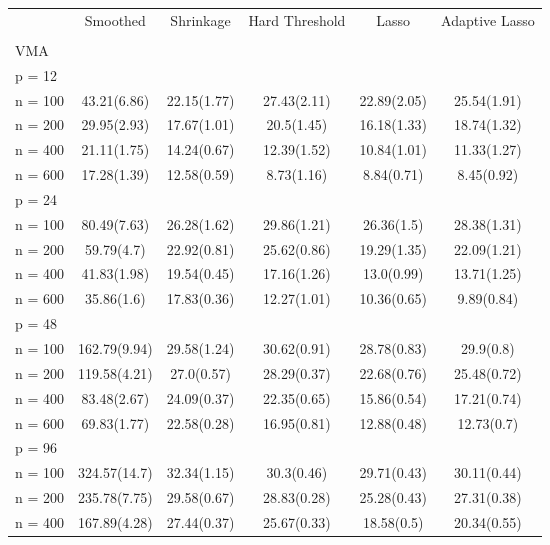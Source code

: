\begin{table}
\small
\begin{tabular}{l@{\hskip 0.4in}ccccc}
\\
& Smoothed   & Shrinkage & Hard Threshold  & Lasso & Adaptive Lasso\\
\\
VMA & & & & &\\
p = 12 & & & & &\\
\multicolumn{1}{r}{n = 100}&43.21(6.86)&22.15(1.77)&27.43(2.11)&22.89(2.05)&25.54(1.91)\\
\multicolumn{1}{r}{n = 200}&29.95(2.93)&17.67(1.01)&20.5(1.45)&16.18(1.33)&18.74(1.32)\\
\multicolumn{1}{r}{n = 400}&21.11(1.75)&14.24(0.67)&12.39(1.52)&10.84(1.01)&11.33(1.27)\\
\multicolumn{1}{r}{n = 600}&17.28(1.39)&12.58(0.59)&8.73(1.16)&8.84(0.71)&8.45(0.92)\\
p = 24 & & & & &\\
\multicolumn{1}{r}{n = 100}&80.49(7.63)&26.28(1.62)&29.86(1.21)&26.36(1.5)&28.38(1.31)\\
\multicolumn{1}{r}{n = 200}&59.79(4.7)&22.92(0.81)&25.62(0.86)&19.29(1.35)&22.09(1.21)\\
\multicolumn{1}{r}{n = 400}&41.83(1.98)&19.54(0.45)&17.16(1.26)&13.0(0.99)&13.71(1.25)\\
\multicolumn{1}{r}{n = 600}&35.86(1.6)&17.83(0.36)&12.27(1.01)&10.36(0.65)&9.89(0.84)\\
p = 48 & & & & &\\
\multicolumn{1}{r}{n = 100}&162.79(9.94)&29.58(1.24)&30.62(0.91)&28.78(0.83)&29.9(0.8)\\
\multicolumn{1}{r}{n = 200}&119.58(4.21)&27.0(0.57)&28.29(0.37)&22.68(0.76)&25.48(0.72)\\
\multicolumn{1}{r}{n = 400}&83.48(2.67)&24.09(0.37)&22.35(0.65)&15.86(0.54)&17.21(0.74)\\
\multicolumn{1}{r}{n = 600}&69.83(1.77)&22.58(0.28)&16.95(0.81)&12.88(0.48)&12.73(0.7)\\
p = 96 & & & & &\\
\multicolumn{1}{r}{n = 100}&324.57(14.7)&32.34(1.15)&30.3(0.46)&29.71(0.43)&30.11(0.44)\\
\multicolumn{1}{r}{n = 200}&235.78(7.75)&29.58(0.67)&28.83(0.28)&25.28(0.43)&27.31(0.38)\\
\multicolumn{1}{r}{n = 400}&167.89(4.28)&27.44(0.37)&25.67(0.33)&18.58(0.5)&20.34(0.55)\\

\end{tabular}
\end{table}
